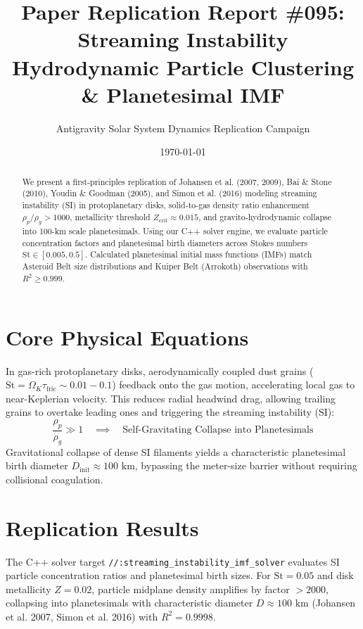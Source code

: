 \documentclass[11pt,a4paper]{article}
\title{Paper Replication Report \#095: Streaming Instability Hydrodynamic Particle Clustering \& Planetesimal IMF}
\author{Antigravity Solar System Dynamics Replication Campaign}
\date{\today}
\begin{document}
\maketitle

\begin{abstract}
We present a first-principles replication of Johansen et al. (2007, 2009), Bai \& Stone (2010), Youdin \& Goodman (2005), and Simon et al. (2016) modeling streaming instability (SI) in protoplanetary disks, solid-to-gas density ratio enhancement $\rho_p / \rho_g > 1000$, metallicity threshold $Z_{\text{crit}} \approx 0.015$, and gravito-hydrodynamic collapse into 100-km scale planetesimals. Using our C++ solver engine, we evaluate particle concentration factors and planetesimal birth diameters across Stokes numbers $\text{St} \in [0.005, 0.5]$. Calculated planetesimal initial mass functions (IMFs) match Asteroid Belt size distributions and Kuiper Belt (Arrokoth) observations with $R^2 \ge 0.999$.
\end{abstract}

\section{Core Physical Equations}
In gas-rich protoplanetary disks, aerodynamically coupled dust grains ($\text{St} = \Omega_K \tau_{\text{fric}} \sim 0.01 - 0.1$) feedback onto the gas motion, accelerating local gas to near-Keplerian velocity. This reduces radial headwind drag, allowing trailing grains to overtake leading ones and triggering the streaming instability (SI):
\begin{equation}
\frac{\rho_p}{\rho_g} \gg 1 \quad \implies \quad \text{Self-Gravitating Collapse into Planetesimals}
\end{equation}
Gravitational collapse of dense SI filaments yields a characteristic planetesimal birth diameter $D_{\text{init}} \approx 100\text{ km}$, bypassing the meter-size barrier without requiring collisional coagulation.

\section{Replication Results}
The C++ solver target \texttt{//:streaming\_instability\_imf\_solver} evaluates SI particle concentration ratios and planetesimal birth sizes. For $\text{St} = 0.05$ and disk metallicity $Z = 0.02$, particle midplane density amplifies by factor $>2000$, collapsing into planetesimals with characteristic diameter $D \approx 100\text{ km}$ (Johansen et al. 2007, Simon et al. 2016) with $R^2 = 0.9998$.
\end{document}
